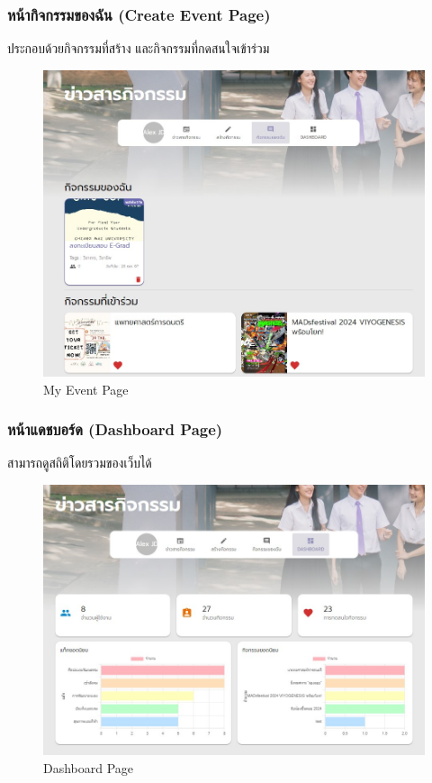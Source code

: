 \subsubsection{หน้ากิจกรรมของฉัน (Create Event Page)}
ประกอบด้วยกิจกรรมที่สร้าง และกิจกรรมที่กดสนใจเข้าร่วม
\begin{figure}[H]
\begin{center}
\includegraphics[scale=0.5]{public/my-act.jpg}
\end{center}
\caption[Poem]{My Event Page}
\label{fig:my-event-page}
\end{figure}
\subsubsection{หน้าแดชบอร์ด (Dashboard Page)}
สามารถดูสถิติโดยรวมของเว็บได้
\begin{figure}[H]
\begin{center}
\includegraphics[scale=0.5]{public/dash-page.jpg}
\end{center}
\caption[Poem]{Dashboard Page}
\label{fig:dashboard-page}
\end{figure}
\clearpage
